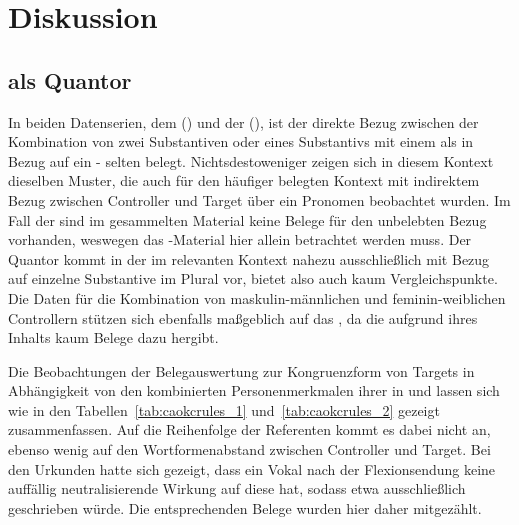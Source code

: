 \chapter{Diskussion}
\label{ch:diskussion}

\section{ als Quantor}
\label{sec:beidequant}
\largerpage
In beiden Datenserien, dem 
(\CAO{}) und der  (\KC{}), ist der direkte Bezug zwischen
der Kombination von zwei Substantiven oder eines Substantivs mit
einem  als  in Bezug auf ein
- selten belegt. Nichtsdestoweniger zeigen sich
in diesem Kontext dieselben Muster, die auch für den häufiger belegten Kontext
mit indirektem Bezug zwischen Controller und Target über ein Pronomen
beobachtet wurden. Im Fall der \KC{} sind im gesammelten Material keine Belege
für den unbelebten Bezug vorhanden, weswegen das \CAO{}-Material
hier allein betrachtet werden muss. Der Quantor  
\autocite[vgl.][606--621]{ksw2} kommt in der \KC{} im relevanten Kontext nahezu
ausschließlich mit Bezug auf einzelne Substan\-tive im Plural vor, bietet also
auch kaum Vergleichspunkte. Die Daten für die Kombination von
maskulin-männlichen und feminin-weiblichen Controllern stützen sich ebenfalls
maßgeblich auf das \CAO{}, da die \KC{} aufgrund ihres Inhalts kaum Belege dazu
hergibt.

Die Beobachtungen der Belegauswertung zur Kongruenzform von Targets
in Abhängigkeit von den kombinierten Personenmerkmalen
ihrer  in  und
 lassen sich wie in den Tabellen~\ref{tab:caokcrules_1}
und~\ref{tab:caokcrules_2} gezeigt zusammenfassen. Auf die
Reihenfolge der Referenten kommt es dabei nicht an, ebenso wenig
auf den Wortformenabstand zwischen Controller und Target.
Bei den Urkunden hatte sich gezeigt, dass ein Vokal nach der
Flexionsendung  keine auffällig neutrali\-sie\-rende Wirkung auf
diese hat, sodass etwa ausschließlich  geschrieben würde. Die
entsprechenden Belege wurden hier daher mitgezählt.

